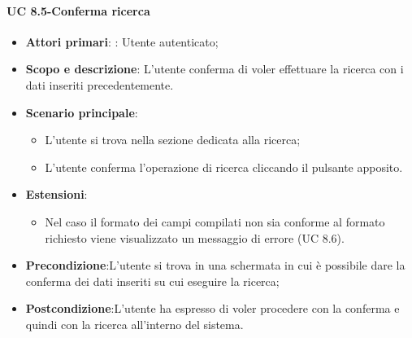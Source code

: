         \paragraph{UC 8.5-Conferma ricerca}
            \begin{itemize}
                \item \textbf{Attori primari}: : Utente autenticato;
                
                \item \textbf{Scopo e descrizione}: L'utente conferma di voler effettuare la ricerca con i dati inseriti precedentemente. 
                \item \textbf{Scenario principale}:
                    \begin{itemize}
                        \item L'utente si trova nella sezione dedicata alla ricerca;
                        \item L'utente conferma l'operazione di ricerca cliccando il pulsante apposito.
                    \end{itemize}
                    \item \textbf{Estensioni}: 
            \begin{itemize}
                \item Nel caso il formato dei campi compilati non sia conforme al formato richiesto viene visualizzato un messaggio di errore (UC 8.6).
            \end{itemize}
                \item \textbf{Precondizione}:L'utente si trova in una schermata in cui è possibile dare la conferma dei dati inseriti su cui eseguire la ricerca;
                \item \textbf{Postcondizione}:L’utente ha espresso di voler procedere con la conferma e quindi con la ricerca all'interno del sistema.
            \end{itemize}
        
        
        
